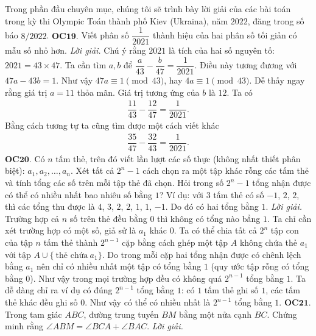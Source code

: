 \begin{multicols}{2}
	Trong phần đầu chuyên mục, chúng tôi sẽ trình bày lời giải của các bài toán trong kỳ thi Olympic Toán thành phố Kiev (Ukraina), năm $2022$,   đăng trong số báo $8/2022$. 
	\vskip 0.1cm
	{\bf\color{cackithi} OC$\pmb{19.}$}  Viết phân số $\dfrac{1}{2021}$ thành hiệu của hai phân số tối giản có mẫu số nhỏ hơn.
	\vskip 0.1cm
	\textit{Lời giải.} Chú ý rằng $2021$ là tích của hai số nguyên tố: $2021=43\times 47$.
	\vskip 0.1cm
	Ta cần tìm $a, b$ để $\dfrac{a}{43} - \dfrac{b}{47}= \dfrac{1}{2021}$. Điều này tương đương với $47a-43b=1$. Như vậy $47a\equiv 1 \pmod{43}$, hay $4a\equiv 1\pmod{43}$. Dễ thấy ngay rằng giá trị $a=11$ thỏa mãn. Giá trị tương ứng của $b$ là $12$. Ta có 
	\begin{align*}
		\dfrac{11}{43} - \dfrac{12}{47}= \dfrac{1}{2021}.
	\end{align*} 
	Bằng cách tương tự ta cũng tìm được một cách viết khác 
	\begin{align*}
		\dfrac{35}{47} - \dfrac{32}{43}= \dfrac{1}{2021}.
	\end{align*}
	{\bf\color{cackithi} OC$\pmb{20.}$} Có $n$ tấm thẻ, trên đó viết lần lượt các số thực (không nhất thiết phân biệt): $a_1, a_2, \ldots, a_n $.  Xét tất cả $ 2^n-1 $ cách chọn ra một tập khác rỗng các tấm thẻ và tính tổng các số trên mỗi tập thẻ đã chọn. Hỏi trong số $2^n-1$ tổng nhận được có thể có nhiều nhất bao nhiêu số bằng $1$?
	\vskip 0.1cm
	Ví dụ: với $3$ tấm thẻ có số $-1$, $2$, $2$, thì các tổng thu được là $4$, $3$, $2$, $2$, $1$, $1$, $-1$. Do đó có hai tổng bằng $1$.
	\vskip 0.1cm
	\textit{Lời giải.} Trường hợp cả $n$ số trên thẻ đều bằng $0$ thì không có tổng nào bẳng $1$. Ta chỉ cần xét trường hợp có một số, giả sử là $a_1$ khác $0$. Ta có thể chia tất cả $2^n$ tập con của tập $n$ tấm thẻ thành $2^{n-1}$ cặp bằng cách ghép một tập $A$ không chứa thẻ $a_1$ với tập $A\cup \{\ \text{thẻ chứa}\ a_1\}$. Do trong mỗi cặp hai tổng nhận được có chênh lệch bằng $a_1$ nên chỉ có nhiều nhất một tập có tổng bằng $1$ (quy ước tập rỗng có tổng bằng $0$).
	\vskip 0.1cm
	Như vậy trong mọi trường hợp đều có không quá $2^{n-1}$ tổng bằng $1$. Ta dễ dàng chỉ ra ví dụ có đúng $2^{n-1}$ tổng bằng $1$:  có  $1$ tấm thẻ ghi số $1$, các tấm thẻ khác đều ghi số $0$. Như vậy có thể có nhiều nhất là $2^{n-1}$ tổng bằng $1$.
	\vskip 0.1cm
	{\bf\color{cackithi} OC$\pmb{21.}$} Trong tam giác $ ABC$, đường trung tuyến $BM$ bằng một nửa cạnh $BC$. Chứng minh rằng $ \angle ABM = \angle BCA + \angle BAC$.
	\vskip 0.1cm
	\textit{Lời giải.}
	\begin{center}

\end{center}
\end{multicols}
